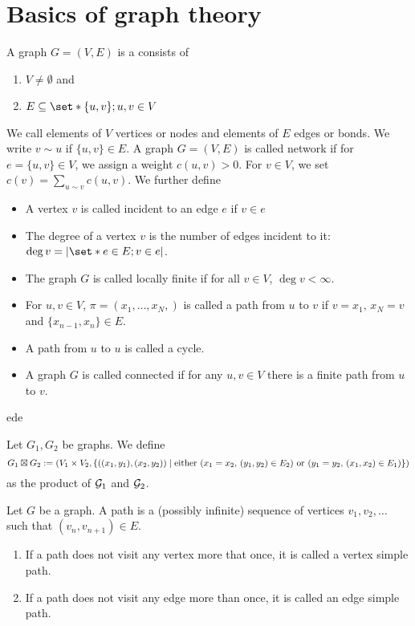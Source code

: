 \section{Basics of graph theory}

\begin{defn}[Graph]
    A graph \(G=(V,E)\) is a consists of 
    \begin{enumerate}
      \item \(V \neq \emptyset\) and
      \item \(E \ssq \set*{ \{u,v\}; u,v \in V}\)
    \end{enumerate}
    We call elements of $V$ vertices or nodes and elements of \(E\) edges or bonds. We write $v\sim u$ if \(\{u,v\}\in E\). A graph $G=(V,E)$ is called network if for $e=\{u,v\} \in V$, we assign a weight $c(u,v)>0$. For $v \in V$, we set $c(v)=\sum_{u \sim v}c(u,v)$. We further define 
    \begin{itemize}
      \item A vertex $v$ is called incident to an edge $e$ if $v \in e$
      \item The degree of a vertex $v$ is the number of edges incident to it: \(\operatorname{deg}v= \abs{\set*{e\in E; v\in e}} \).
      \item The graph $G$ is called locally finite if for all $v \in V$, \(\operatorname{deg}v<\infty\).
      \item For $u,v \in V$, $\pi =(x_1,\dots,x_N,)$ is called a path from $u$ to $v$ if $v=x_1,\, x_N=v$ and $ \{x_{n-1},x_n\} \in E$.  
      \item A path from $u$ to $u$ is called a cycle.
      \item A graph $G$ is called connected if for any $u,v \in V$ there is a finite path from $u$ to $v$.
    \end{itemize}
    
\end{defn}

ede


\begin{defn}
    Let $G_1, G_2$ be graphs. We define  
    \[G_1 \boxtimes G_2:= (V_1\times V_2, \left\{ {((x_1,y_1),(x_2,y_2))\; \vert \; \textrm{either }(x_1=x_2 ,\,(y_1,y_2)\in E_2) \textrm{ or } (y_1=y_2,\,(x_1,x_2)\in E_1)} \right\})\]
    as the product of $\mathcal{G}_1$ and \(\mathcal{G}_2\).
\end{defn}


\begin{defn}
  Let $G$ be a graph. A path is a (possibly infinite) sequence of vertices $v_1,v_2,\dots$ such that $(v_n,v_{n+1})\in E$. 
  \begin{enumerate}
    \item If a path does not visit any vertex more that once, it is called a vertex simple path.
    \item If a path does not visit any edge more than once, it is called an edge simple path.
  \end{enumerate}
\end{defn}


